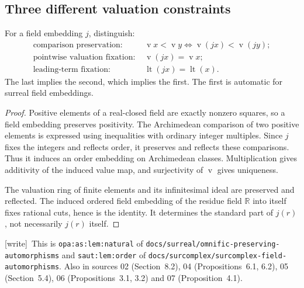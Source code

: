 \documentclass[11pt,a4paper]{article}
\numberwithin{equation}{section}
\theoremstyle{plain}
\newtheorem{proposition}[theorem]{Proposition}
\theoremstyle{definition}
\theoremstyle{remark}
\newcommand{\No}{\mathbf{No}}
\newcommand{\R}{\mathbb{R}}
\newcommand{\val}{\operatorname{v}}
\newcommand{\lbl}[1]{\nolinkurl{#1}}%
\newcommand{\fn}[1]{\nolinkurl{#1}}%
\newcommand{\wtag}{\textup{\textsf{[write]}}}%
\newenvironment{wnote}{\par\smallskip\noindent\wtag\ }{\par\smallskip}
\begin{document}
\subsection{Three different valuation constraints}
For a field embedding $j$, distinguish:
\begin{align*}
\text{comparison preservation: }&
 \val x<\val y\iff\val(jx)<\val(jy);\\
\text{pointwise valuation fixation: }&
 \val(jx)=\val x;\\
\text{leading-term fixation: }&
 \operatorname{lt}(jx)=\operatorname{lt}(x).
\end{align*}
The last implies the second, which implies the first. The first is
automatic for surreal field embeddings.

\begin{proof}
Positive elements of a real-closed field are exactly nonzero squares, so
a field embedding preserves positivity. The Archimedean comparison of two
positive elements is expressed using inequalities with ordinary integer
multiples. Since $j$ fixes the integers and reflects order, it preserves
and reflects these comparisons. Thus it induces an order embedding on
Archimedean classes. Multiplication gives additivity of the induced value
map, and surjectivity of $\val$ gives uniqueness.

The valuation ring of finite elements and its infinitesimal ideal are
preserved and reflected. The induced ordered field embedding of the
residue field $\R$ into itself fixes rational cuts, hence is the identity.
It determines the standard part of $j(r)$, not necessarily $j(r)$ itself.
\end{proof}
\begin{wnote}This is \lbl{opa:as:lem:natural} of \fn{docs/surreal/omnific-preserving-automorphisms} and \lbl{saut:lem:order} of \fn{docs/surcomplex/surcomplex-field-automorphisms}. Also in sources 02 (Section~8.2), 04 (Propositions~6.1, 6.2), 05 (Section~5.4), 06 (Propositions~3.1, 3.2) and 07 (Proposition~4.1).\end{wnote}
\end{document}
